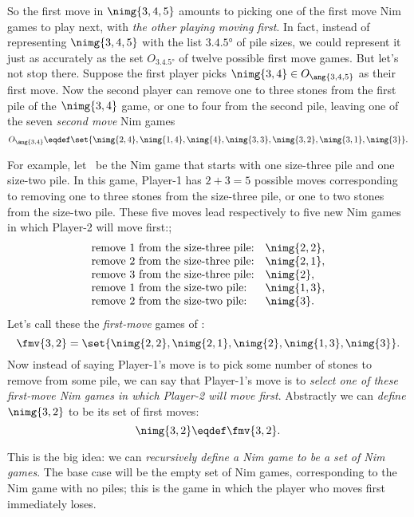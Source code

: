 \begin{definition}
So the first move in $\nimg{3,4,5}$ amounts to picking one of the
first move Nim games to play next, with \emph{the other playing moving
  first}.  In fact, instead of representing $\nimg{3,4,5}$ with the
list $\ang{3,4,5}$ of pile sizes, we could represent it just as
accurately as the set $O_{\ang{3,4,5}}$ of twelve possible first move
games.  But let's not stop there.  Suppose the first player picks
$\nimg{3,4} \in O_{\ang{3,4,5}}$ as their first move.  Now the second
player can remove one to three stones from the first pile of the
$\nimg{3,4}$ game, or one to four from the second pile, leaving one of
  the seven \emph{second move} Nim games
\[
O_{\ang{3,4}} \eqdef \set{\nimg{2,4}, \nimg{1,4}, \nimg{4}, \nimg{3,3},
  \nimg{3,2}, \nimg{3,1}, \nimg{3}}.
\]
\fi

For example, let \ be the Nim game that starts with one
size-three pile and one size-two pile.  In this game, Player-1 has
$2+3 =5$ possible moves corresponding to removing one to three stones
from the size-three pile, or one to two stones from the size-two pile.
These five moves lead respectively to five new Nim games in which Player-2 will move first:;
\[\begin{array}{ll}
\text{remove 1 from the size-three pile:} & \nimg{2, 2},\\
\text{remove 2 from the size-three pile:} & \nimg{2, 1},\\
\text{remove 3 from the size-three pile:} & \nimg{2},\\
\text{remove 1 from the size-two pile:}   & \nimg{1, 3},\\
\text{remove 2 from the size-two pile:}   & \nimg{3}.
\end{array}\]
Let's call these the \emph{first-move} games  of :
\begin{equation}\label{fmvnim32}
\fmv{3,2} = \set{\nimg{2, 2}, \nimg{2, 1}, \nimg{2}, \nimg{1, 3},
  \nimg{3}}.
\end{equation}
Now instead of saying Player-1's move is to pick some number of stones
to remove from some pile, we can say that Player-1's move is to
\emph{select one of these first-move Nim games in which
  Player-2 will move first}.  Abstractly we can \emph{define} $\nimg{3,2}$
to be its set of first moves:
\[
\nimg{3,2} \eqdef \fmv{3,2}.
\]

This is the big idea: we can \emph{recursively define a Nim game to be
  a set of Nim games}.  The base case will be the empty set of Nim
games, corresponding to the Nim game with no piles; this is the game
in which the player who moves first immediately loses.


\end{definition}
